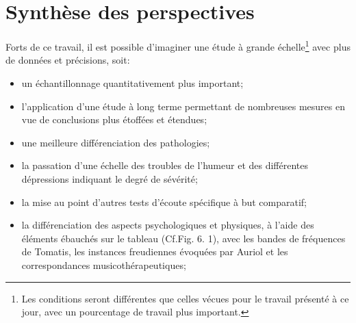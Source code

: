 \section{Synthèse des perspectives}

Forts de ce travail, il est possible d'imaginer une étude à  grande
échelle\footnote{Les conditions seront différentes que celles vécues pour le
travail présenté à ce jour, avec un pourcentage de travail plus
important.} avec plus de données et précisions, soit:

\begin{itemize}

\item un échantillonnage quantitativement plus important;

\item  l'application d'une étude à long terme permettant de nombreuses
  mesures en vue de conclusions plus étoffées et étendues;

   \item  une meilleure différenciation des pathologies;
   \item la passation d'une échelle des troubles de l'humeur et des différentes
       dépressions indiquant le degré de sévérité;
     \item la mise au point  d'autres tests d'écoute spécifique à but
       comparatif;
     \item la différenciation des aspects
       psychologiques et physiques, à l'aide des éléments ébauchés sur
       le tableau (Cf.Fig. 6. 1), avec les bandes de fréquences de
       Tomatis, les instances freudiennes évoquées par Auriol et
       les correspondances musicothérapeutiques;









\end{itemize}
